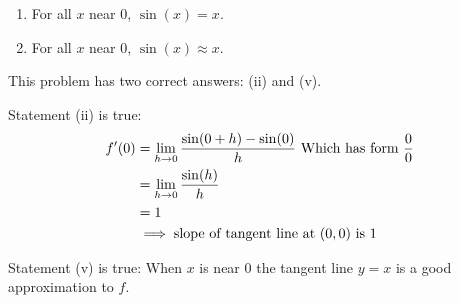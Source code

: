 \documentclass{ximera}
\begin{document}
\begin{problem}
\begin{enumerate}
\begin{enumerate}
        \item
          For all $x$ near $0$, $\sin(x) = x$.

        \item
          For all $x$ near $0$, $\sin(x) \approx x$.
      \end{enumerate}
      \begin{explanation}
        This problem has two correct answers: (ii) and (v).

        Statement (ii) is true:
        \begin{align*}
          f'(0) &= \displaystyle \lim_{h \to 0} \dfrac{\sin(0 + h) - \sin (0)}{h} \textrm{ Which has form } \dfrac{0}{0} \\
                &= \displaystyle \lim_{h \to 0} \dfrac{\sin(h)}{h} \\
                &= 1\\
          &\implies \mbox{slope of tangent line at $(0,0)$ is $1$}
        \end{align*}

        Statement (v) is true:
        When $x$ is near $0$ the tangent line $y = x$ is a good approximation to $f$.
      \end{explanation}
\end{enumerate}

	
\end{problem}
\end{document}
